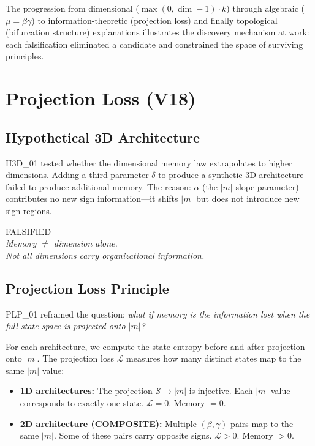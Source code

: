 \documentclass[11pt,a4paper,oneside]{report}
\newcommand{\projLoss}{\ensuremath{\mathcal{L}}}
\newcommand{\stateSpace}{\ensuremath{\mathcal{S}}}
\newcommand{\falsified}{\textcolor{falsified}{FALSIFIED}}
\begin{document}
The progression from dimensional ($\max(0, \dim-1)\cdot k$) through
algebraic ($\mu = \beta\gamma$) to information-theoretic (projection loss)
and finally topological (bifurcation structure) explanations illustrates
the discovery mechanism at work: each falsification eliminated a candidate
and constrained the space of surviving principles.

\section{Projection Loss (V18)}\label{sec:projection}

\subsection{Hypothetical 3D Architecture}

H3D\_01 tested whether the dimensional memory law extrapolates to higher
dimensions. Adding a third parameter $\delta$ to produce a synthetic 3D
architecture failed to produce additional memory. The reason: $\alpha$
(the $|m|$-slope parameter) contributes no new sign information---it
shifts $|m|$ but does not introduce new sign regions.

\begin{center}
\falsified{}\\[4pt]
\textit{Memory $\neq$ dimension alone.}\\[2pt]
\textit{Not all dimensions carry organizational information.}
\end{center}

\subsection{Projection Loss Principle}

PLP\_01 reframed the question: \textit{what if memory is the information
lost when the full state space is projected onto $|m|$?}

For each architecture, we compute the state entropy before and after
projection onto $|m|$. The projection loss $\projLoss$ measures how many
distinct states map to the same $|m|$ value:

\begin{itemize}[nosep]
  \item \textbf{1D architectures:} The projection $\stateSpace \rightarrow |m|$
    is injective. Each $|m|$ value corresponds to exactly one state.
    $\projLoss = 0$. Memory $= 0$.
  \item \textbf{2D architecture (COMPOSITE):} Multiple $(\beta, \gamma)$ pairs
    map to the same $|m|$. Some of these pairs carry opposite signs.
    $\projLoss > 0$. Memory $> 0$.
\end{itemize}
\end{document}
